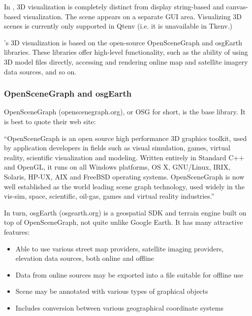 In {\opp}, 3D visualization is completely distinct from display
string-based and canvas-based visualization. The scene appears on a
separate GUI area. Visualizing 3D scenes is currently only supported
in Qtenv (i.e. it is unavailable in Tkenv.)

{\opp}'s 3D visualization is based on the open-source OpenSceneGraph
and osgEarth libraries. These libraries offer high-level functionality,
such as the ability of using 3D model files directly, accessing and
rendering online map and satellite imagery data sources, and so on.

\subsubsection{OpenSceneGraph and osgEarth}
\label{sec:graphics:osg-and-osgearth}

OpenSceneGraph (openscenegraph.org), or OSG for short, is the base library.
It is best to quote their web site:

\begin{displayquote}
``OpenSceneGraph is an open source high performance 3D graphics toolkit,
used by application developers in fields such as visual simulation, games,
virtual reality, scientific visualization and modeling. Written entirely in
Standard C++ and OpenGL, it runs on all Windows platforms, OS X, GNU/Linux,
IRIX, Solaris, HP-UX, AIX and FreeBSD operating systems. OpenSceneGraph is
now well established as the world leading scene graph technology, used
widely in the vis-sim, space, scientific, oil-gas, games and virtual
reality industries.''
\end{displayquote}

In turn, osgEarth (osgearth.org) is a geospatial SDK and terrain engine built on top
of OpenSceneGraph, not quite unlike Google Earth. It has many attractive features:

\begin{itemize}
\item Able to use various street map providers, satellite imaging providers,
      elevation data sources, both online and offline
\item Data from online sources may be exported into a file suitable for offline use
\item Scene may be annotated with various types of graphical objects
\item Includes conversion between various geographical coordinate systems
\end{itemize}

